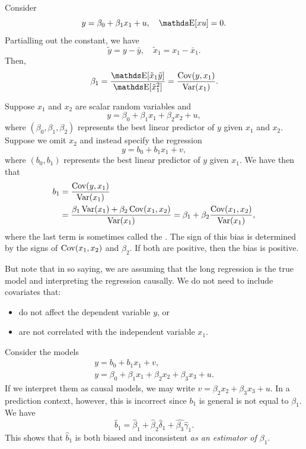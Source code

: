 \documentclass[letterpaper, 10pt]{article}
\begin{document}
\begin{example}
  Consider
  \[
    y = \beta_0 + \beta_1 x_1 + u, \quad \E[xu] = 0.
  \]
  Partialling out the constant, we have
  \[
    \tilde{y} = y - \bar{y}, \quad
    \tilde{x}_1 = x_1 - \bar{x}_1.
  \]
  Then,
  \[
    \beta_1 = \frac{\E[\tilde{x}_1 \tilde{y}]}{\E[\tilde{x}_1^2]}
    = \frac{\Cov(y, x_1)}{\Var(x_1)}.
  \]
\end{example}

\begin{example}
  Suppose \(x_1\) and \(x_2\) are scalar random variables and
  \[
    y = \beta_0 + \beta_1 x_1 + \beta_2 x_2 + u,
  \]
  where \((\beta_0, \beta_1, \beta_2)\) represents the best linear predictor of \(y\) given \(x_1\) and \(x_2\).
  Suppose we omit \(x_2\) and instead specify the regression 
  \[
    y = b_0 + b_1 x_1 + v,
  \]
  where \((b_0, b_1)\) represents the best linear predictor of \(y\) given \(x_1\).
  We have then that
  \begin{align*}
    b_1
    &= \frac{\operatorname{Cov}(y, x_1)}{\operatorname{Var}(x_1)} \\
    &= \frac{\beta_1 \operatorname{Var}(x_1) + \beta_2 \operatorname{Cov}(x_1, x_2)}{\operatorname{Var}(x_1)}
    = \beta_1 + \beta_2 \frac{\operatorname{Cov}(x_1, x_2)}{\operatorname{Var}(x_1)},
  \end{align*}
  where the last term is sometimes called the .
  The sign of this bias is determined by the signs of \(\operatorname{Cov}(x_1, x_2)\) and \(\beta_2\).
  If both are positive, then the bias is positive.

  But note that in so saying, we are assuming that the long regression is the true model and interpreting the regression causally.
  We do not need to include covariates that:
  \begin{itemize}
    \item do not affect the dependent variable \(y\), or
    \item are not correlated with the independent variable \(x_1\).
  \end{itemize}
\end{example}

\begin{example}
  Consider the models
  \begin{gather*}
    y = b_0 + b_1 x_1 + v, \\
    y = \beta_0 + \beta_1 x_1 + \beta_2 x_2 + \beta_3 x_3 + u.
  \end{gather*}
  If we interpret them as causal models, we may write \(v = \beta_2 x_2 + \beta_3 x_3 + u\).
  In a prediction context, however, this is incorrect since \(b_1\) is general is not equal to \(\beta_1\).
  We have
  \[
    \hat{b}_1 = \hat{\beta}_1 + \hat{\beta}_2 \hat{\delta}_1 + \hat{\beta_3} \hat{\gamma}_1.
  \]
  This shows that \(\hat{b}_1\) is both biased and inconsistent \emph{as an estimator of \(\beta_1\)}.
\end{example}
\end{document}
